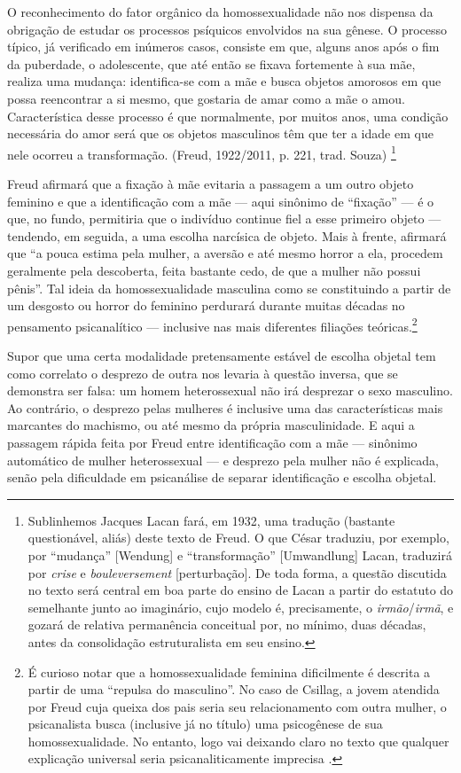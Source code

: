 O reconhecimento do fator orgânico da homossexualidade não nos dispensa
da obrigação de estudar os processos psíquicos envolvidos na sua gênese.
O processo típico, já verificado em inúmeros casos, consiste em que,
alguns anos após o fim da puberdade, o adolescente, que até então se
fixava fortemente à sua mãe, realiza uma mudança: identifica-se com a
mãe e busca objetos amorosos em que possa reencontrar a si mesmo, que
gostaria de amar como a mãe o amou. Característica desse processo é que
normalmente, por muitos anos, uma condição necessária do amor será que
os objetos masculinos têm que ter a idade em que nele ocorreu a
transformação. (Freud, 1922/2011, p. 221, trad. Souza) \footnote{Sublinhemos
  Jacques Lacan fará, em 1932, uma tradução (bastante questionável,
  aliás) deste texto de Freud. O que César traduziu, por exemplo, por
  ``mudança'' {[}Wendung{]} e ``transformação'' {[}Umwandlung{]} Lacan,
  traduzirá por \emph{crise} e \emph{bouleversement} {[}perturbação{]}.
  De toda forma, a questão discutida no texto será central em boa parte
  do ensino de Lacan a partir do estatuto do semelhante junto ao
  imaginário, cujo modelo é, precisamente, o \emph{irmão}/\emph{irmã}, e
  gozará de relativa permanência conceitual por, no mínimo, duas
  décadas, antes da consolidação estruturalista em seu ensino.}

Freud afirmará que a fixação à mãe evitaria a passagem a um outro objeto
feminino e que a identificação com a mãe --- aqui sinônimo de
``fixação'' --- é o que, no fundo, permitiria que o indivíduo continue
fiel a esse primeiro objeto --- tendendo, em seguida, a uma escolha
narcísica de objeto. Mais à frente, afirmará que ``a pouca estima pela
mulher, a aversão e até mesmo horror a ela, procedem geralmente pela
descoberta, feita bastante cedo, de que a mulher não possui pênis''. Tal
ideia da homossexualidade masculina como se constituindo a partir de um
desgosto ou horror do feminino perdurará durante muitas décadas no
pensamento psicanalítico --- inclusive nas mais diferentes filiações
teóricas.\footnote{É curioso notar que a homossexualidade feminina
  dificilmente é descrita a partir de uma ``repulsa do masculino''. No
  caso de Csillag, a jovem atendida por Freud cuja queixa dos pais seria
  seu relacionamento com outra mulher, o psicanalista busca (inclusive
  já no título) uma psicogênese de sua homossexualidade. No entanto,
  logo vai deixando claro no texto que qualquer explicação universal
  seria psicanaliticamente imprecisa .}

Supor que uma certa modalidade pretensamente estável de escolha objetal
tem como correlato o desprezo de outra nos levaria à questão inversa,
que se demonstra ser falsa: um homem heterossexual não irá desprezar o
sexo masculino. Ao contrário, o desprezo pelas mulheres é inclusive uma
das características mais marcantes do machismo, ou até mesmo da própria
masculinidade. E aqui a passagem rápida feita por Freud entre
identificação com a mãe --- sinônimo automático de mulher heterossexual
--- e desprezo pela mulher não é explicada, senão pela dificuldade em
psicanálise de separar identificação e escolha objetal.

